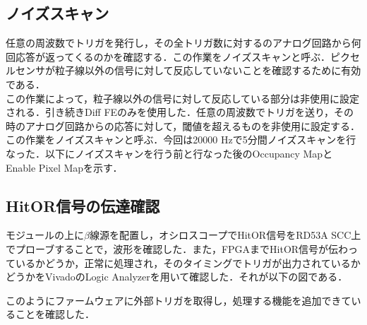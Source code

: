 
\subsection{ノイズスキャン}
任意の周波数でトリガを発行し，その全トリガ数に対するのアナログ回路から何回応答が返ってくるのかを確認する．この作業をノイズスキャンと呼ぶ．ピクセルセンサが粒子線以外の信号に対して反応していないことを確認するために有効である．\\
この作業によって，粒子線以外の信号に対して反応している部分は非使用に設定される．引き続きDiff FEのみを使用した．任意の周波数でトリガを送り，その時のアナログ回路からの応答に対して，閾値を超えるものを非使用に設定する．この作業をノイズスキャンと呼ぶ．今回は20000 $\mathrm{Hz}$で5分間ノイズスキャンを行なった．以下にノイズスキャンを行う前と行なった後のOccupancy MapとEnable Pixel Mapを示す．

\subsection{HitOR信号の伝達確認}
モジュールの上に$\beta$線源を配置し，オシロスコープでHitOR信号をRD53A SCC上でプローブすることで，波形を確認した．また，FPGAまでHitOR信号が伝わっているかどうか，正常に処理され，そのタイミングでトリガが出力されているかどうかをVivadoのLogic Analyzerを用いて確認した．それが以下の図である．



このようにファームウェアに外部トリガを取得し，処理する機能を追加できていることを確認した．






